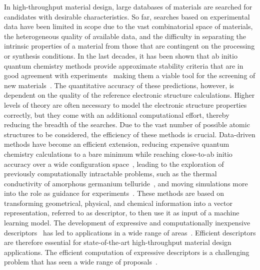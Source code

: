 In high-throughput material design, large databases of materials are searched for candidates with desirable characteristics.
So far, searches based on experimental data have been limited in scope due to the vast combinatorial space of materials, the heterogeneous quality of available data, and the difficulty in separating the intrinsic properties of a material from those that are contingent on the processing or synthesis conditions.
In the last decades, it has been shown that ab initio quantum chemistry methods provide approximate stability criteria that are in good agreement with experiments~\cite{jansen2015conceptual} making them a viable tool for the screening of new materials~\cite{ceder1998identification, andersson2006toward, yang2012search, gomez2016design}.
The quantitative accuracy of these predictions, however, is dependent on the quality of the reference electronic structure calculations. 
Higher levels of theory are often necessary to model the electronic structure properties correctly, but they come with an additional computational effort, thereby reducing the breadth of the searches.
Due to the vast number of possible atomic structures to be considered, the efficiency of these methods is crucial.
Data-driven methods have become an efficient extension, reducing expensive quantum chemistry calculations to a bare minimum while reaching close-to-ab initio accuracy over a wide configuration space~\cite{bartok2018machine}, leading to the exploration of previously computationally intractable problems, such as the thermal conductivity of amorphous germanium telluride~\cite{sosso2012thermal}, and moving simulations more into the role as guidance for experiments~\cite{chang_simulations_2023}.
These methods are based on transforming geometrical, physical, and chemical information into a vector representation, referred to as descriptor, to then use it as input of a machine learning model.
The development of expressive and computationally inexpensive descriptors~\cite{behl11jcp, bart+13prb} has led to applications in a wide range of areas~\cite{mansouri2018machine, sosso2018understanding, basdogan2019machine}. 
Efficient descriptors are therefore essential for state-of-the-art high-throughput material design applications.
The efficient computation of expressive descriptors is a challenging problem that has seen a wide range of proposals~\cite{behl11jcp, rupp2012fast, bart+13prb, huo2017unified}.
